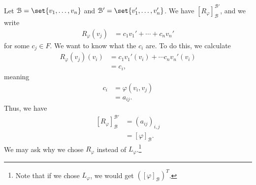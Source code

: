 \documentclass[10pt]{mypackage}
\begin{document}
  Let $\mathcal{B} = \set{v_1,\dots,v_n}$ and $\mathcal{B}' = \set{v_1',\dots,v_n'}$. We have $\left[R_{\varphi}\right]_{\mathcal{B}}^{\mathcal{B}'}$, and we write
  \begin{align*}
    R_{\varphi}\left(v_j\right) &= c_1v_1' + \cdots + c_nv_n'
  \end{align*}
  for some $c_j\in F$. We want to know what the $c_i$ are. To do this, we calculate
  \begin{align*}
    R_{\varphi}\left(v_j\right)\left(v_i\right) &= c_1v_1'\left(v_i\right) + \cdots c_nv_n'\left(v_i\right)\\
                                                &= c_i,
  \end{align*}
  meaning
  \begin{align*}
    c_i &= \varphi\left(v_i,v_j\right)\\
        &= a_{ij}.
  \end{align*}
  Thus, we have
  \begin{align*}
    \left[R_{\varphi}\right]_{\mathcal{B}}^{\mathcal{B}'} &= \left(a_{ij}\right)_{i,j}\\
                                                          &= \left[\varphi\right]_{\mathcal{B}}.
  \end{align*}
  We may ask why we chose $R_{\varphi}$ instead of $L_{\varphi}$.\footnote{Note that if we chose $L_{\varphi}$, we would get $\left(\left[\varphi\right]_{\mathcal{B}}\right)^{T}$.}\newline
\end{document}
